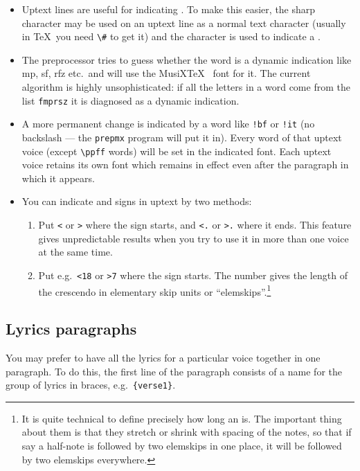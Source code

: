 \documentclass[11pt]{article}
\begin{document}
\begin{itemize}
  \item Uptext lines are useful for indicating .  
To make this
easier, the sharp character \ttxem{\#} may be used on an uptext line as a 
normal text character (usually in \TeX\ you need \verb'\#' to get it)
and the \ttxem{\%} character is used to indicate a 
\indexed{\mtxFlat}. \index{\Flat@\mtxFlat} 
  \item The preprocessor tries to guess whether the word is a dynamic 
indication like {\ppff mp}, {\ppff sf}, {\ppff rfz} etc.\ and will use the 
MusiX\TeX\  font for it.  The current algorithm is highly 
unsophisticated: if all the letters in a word come from the list 
\verb'fmprsz' it is diagnosed as a dynamic indication.
  \item A more permanent   
change is indicated by a word like \verb"!bf" or  \verb"!it" (no
backslash --- the \texttt{prepmx} program will put it in).  
Every word of that uptext voice (except \verb"\ppff" words) will be set in the 
indicated font.  Each uptext voice retains its own font which remains in 
effect even after the paragraph in which it appears. 
  \item  You can indicate  and
 signs in uptext by two methods:
 \begin{enumerate} 
  \item Put \verb'<' or \verb'>'
where the sign starts, and \verb'<.' or \verb'>.' where it ends.
This feature gives unpredictable results when you try to use it
in more than one voice at the same time.  
  \item  
Put e.g.~\verb"<18" or \verb">7" where the sign starts.   
  The number gives the length of the crescendo in elementary 
skip units or
``elemskips''.\footnote{It is quite technical to define precisely how
long an  is.  The important thing about them is that they
stretch or shrink with spacing of the notes, so that if say a half-note
is followed by two elemskips in one place, it will be followed by two
elemskips everywhere.}
 \end{enumerate}
  
\end{itemize} 

\subsection{Lyrics paragraphs}

You may prefer to have all the lyrics for a particular voice together
in one paragraph.  To do this, the first line of the paragraph consists
of a name for the group of lyrics in braces, e.g.~\verb'{verse1}'.
\end{document}
